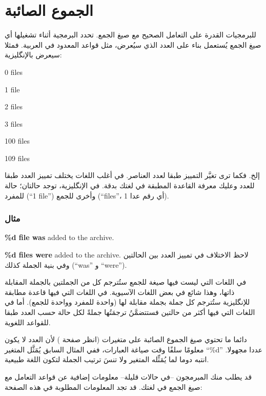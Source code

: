 
\section[ref:33482409]{الجموع الصائبة}
للبرمجيات القدرة على التعامل
الصحيح مع صيغ الجمع. تحدد البرمجية أثناء تشغيلها أي صيغ الجمع يُستعمل
بناء على العدد الذي سيُعرض، مثل قواعد المعدود في العربية. فمثلا سيعرض
بالإنگليزية:

\startitemize[1]
\item 0 files
\item 1 file
\item 2 files
\item 3 files
\item 100 files
\item 109 files
\item إلخ.
\stopitemize
فكما ترى تغيَّر التمييز طبقا لعدد العناصر. في أغلب اللغات يختلف تمييز
العدد طبقا للعدد وعليك معرفة القاعدة المطبقة في لغتك بدقة. في
الإنگليزية، توجد حالتان؛ حالة للمفرد (“1 file”) وأخرى للجمع (“files”،
أي رقم عدا 1).

\subsubsection{مثال}
\startitemize[1]
\item {\bf \%d file was} added to the archive.
\item {\bf \%d files were} added to the archive.
\stopitemize
لاحظ الاختلاف في تمييز العدد بين الحالتين وفي بنية الجملة كذلك (“was” و
“were”).

في اللغات التي ليست فيها صيغة للجمع ستُترجم كل من الجملتين بالجملة
المقابلة ذاتها، وهذا شائع في بعض اللغات الآسيوية. في اللغات التي فيها
قاعدة مطابقة للإنگليزية ستُترجم كل جملة بجملة مقابلة لها (واحدة للمفرد
وواحدة للجمع). أما في اللغات التي فيها أكثر من حالتين فستتضمَّنُ
ترجمَتُها جملةً لكل حالة حسب العدد طبقا للقواعد اللغوية.

دائما ما تحتوي صيغ الجموع الصائبة على متغيرات (انظر صفحة
\at[ref:33556809]) لأن العدد لا يكون معلومًا سلفًا وقت صياغة
العبارات، ففي المثال السابق يُمَثَّل المتغير ‪“\%d”‬ عددا مجهولا. انتبه
دوما لما يُمَثِّله المتغير ولا تنسَ ترتيب الجملة لتكون اللغة طبيعية.

قد يطلب منك المبرمجون –في حالات قليلة– معلومات إضافية عن قواعد التعامل
مع صيغ الجمع في لغتك. قد تجد المعلومات المطلوبة في هذه الصفحة:


